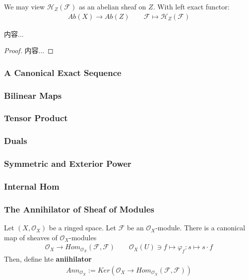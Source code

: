 \documentclass[Total.tex]{subfiles}
\begin{document}
		We may view $\mathcal{H}_Z(\mathcal{F})$ as an abelian sheaf on $Z$. With left exact functor:
		\begin{gather*}
			Ab(X)\rightarrow Ab(Z)\qquad \mathcal{F}\mapsto \mathcal{H}_Z(\mathcal{F})
		\end{gather*}
		
		\begin{lemma}
			内容...
		\end{lemma}
		\begin{proof}
			内容...
		\end{proof}
		
		\subsubsection{A Canonical Exact Sequence}
		
			\subsubsection{Bilinear Maps}
			
			\subsubsection{Tensor Product}
			
			\subsubsection{Duals}
			
			\subsubsection{Symmetric and Exterior Power}
			
			\subsubsection{Internal Hom}
			
			\subsubsection{The Annihilator of Sheaf of Modules}
				
				\begin{Def}
					Let $(X,\mathcal{O}_X)$ be a ringed space. Let $\mathcal{F}$ be an $\mathcal{O}_X$-module. There is a canonical map of sheaves of $\mathcal{O}_X$-modules
					\begin{gather*}
						\mathcal{O}_X\rightarrow Hom_{\mathcal{O}_X}(\mathcal{F},\mathcal{F})\qquad \mathcal{O}_X(U)\ni f\mapsto \varphi_f:s\mapsto s\cdot f
					\end{gather*}
					Then, define hte \textbf{aniihilator} 
					\begin{gather*}
						Ann_{\mathcal{O}_X}:=Ker(\mathcal{O}_X\rightarrow Hom_{\mathcal{O}_X}(\mathcal{F},\mathcal{F}))
					\end{gather*}
				\end{Def}
				
\end{document}
